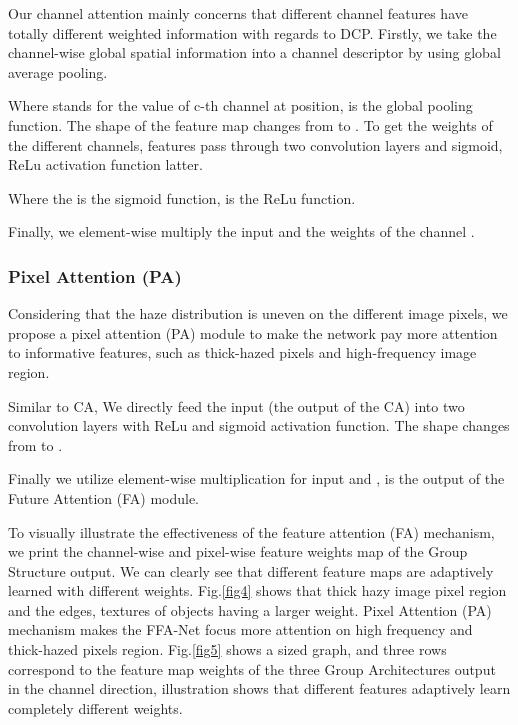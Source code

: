 \documentclass[letterpaper]{article} \usepackage{aaai20}  \usepackage{times}  \usepackage{helvet} \usepackage{courier}  \usepackage[hyphens]{url}  \usepackage{graphicx} \urlstyle{rm} \def\UrlFont{\rm}  \usepackage{graphicx}  \frenchspacing  \setlength{\pdfpagewidth}{8.5in}  \setlength{\pdfpageheight}{11in}  \usepackage{bm}
\begin{document}
Our channel attention mainly concerns that different channel features have totally different weighted information with regards to DCP\cite{featureforward11}.
Firstly, we take the channel-wise global spatial information into a channel descriptor by using global average pooling. 



Where   stands for the value of  c-th channel  at position,  is the global pooling function.
The shape of the feature map changes from  to . To get the weights of the different channels,  features pass through two convolution layers and sigmoid, ReLu  activation function latter.



Where the  is the sigmoid function,  is the ReLu function.

Finally, we element-wise multiply the input  and the weights of the channel .




\subsubsection{Pixel Attention (PA)}
Considering that the haze distribution is uneven on the different image pixels, we propose a pixel attention (PA) module to make the network pay more attention to informative features, such as thick-hazed pixels and high-frequency image region. 

Similar to CA,  We directly feed the input  (the output of the CA)  into two convolution  layers with ReLu and sigmoid activation function. The shape changes from  to . 



Finally we utilize element-wise multiplication for input  and ,   is the output of the Future Attention (FA) module.


To visually illustrate the effectiveness of the feature attention (FA) mechanism, we print the channel-wise and pixel-wise feature weights map of the Group Structure output.
We can clearly see that different feature maps are adaptively learned with different weights.
Fig.\ref{fig4} shows that  thick hazy image pixel region and  the edges,  textures of objects  having a  larger weight. Pixel Attention (PA) mechanism makes the FFA-Net focus more attention on high frequency and thick-hazed pixels region.
Fig.\ref{fig5} shows a  sized graph, and three rows correspond to the feature map weights of the  three Group Architectures output in the channel direction, illustration shows that different features  adaptively learn completely different weights.
\end{document}
